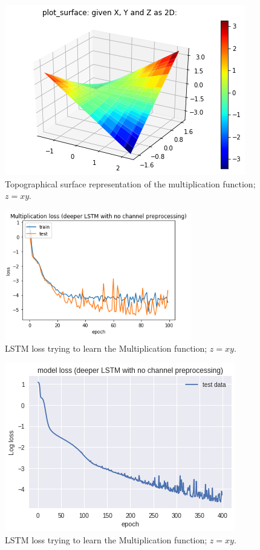 \begin{figure}
\begin{center}
\includegraphics{figures/equal/Multiplication_Function_plot.png}
\caption{Topographical surface representation of the multiplication function; $z=xy$.}
\end{center}
\label{fig:mult_fx}
\end{figure}

\begin{figure}
\begin{center}
\includegraphics{figures/equal/LSTM_loss_multiplication.png}
\caption{LSTM loss trying to learn the Multiplication function; $z=xy$.}
\end{center}
\label{fig:lstm_loss_mult}
\end{figure}

\begin{figure}
\begin{center}
\includegraphics{figures/equal/Multiplication_loss_vs_epoch.png}
\caption{LSTM loss trying to learn the Multiplication function; $z=xy$.}
\end{center}
\label{fig:loss_mult}
\end{figure}

